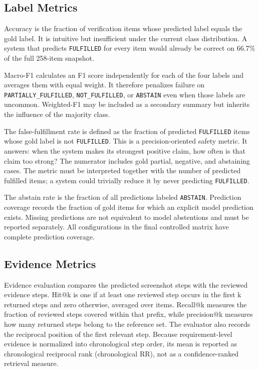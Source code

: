 \subsection{Label Metrics}\label{label-metrics}

Accuracy is the fraction of verification items whose predicted label equals the gold label. It is intuitive but insufficient under the current class distribution. A system that predicts \texttt{FULFILLED} for every item would already be correct on 66.7\% of the full 258-item snapshot.

Macro-F1 calculates an F1 score independently for each of the four labels and averages them with equal weight. It therefore penalizes failure on \texttt{PARTIALLY\_\allowbreak FULFILLED}, \texttt{NOT\_FULFILLED}, or \texttt{ABSTAIN} even when those labels are uncommon. Weighted-F1 may be included as a secondary summary but inherits the influence of the majority class.

The false-fulfillment rate is defined as the fraction of predicted \texttt{FULFILLED} items whose gold label is not \texttt{FULFILLED}. This is a precision-oriented safety metric. It answers: when the system makes its strongest positive claim, how often is that claim too strong? The numerator includes gold partial, negative, and abstaining cases. The metric must be interpreted together with the number of predicted fulfilled items; a system could trivially reduce it by never predicting \texttt{FULFILLED}.

The abstain rate is the fraction of all predictions labeled \texttt{ABSTAIN}. Prediction coverage records the fraction of gold items for which an explicit model prediction exists. Missing predictions are not equivalent to model abstentions and must be reported separately. All configurations in the final controlled matrix have complete prediction coverage.

\subsection{Evidence Metrics}\label{evidence-metrics}

Evidence evaluation compares the predicted screenshot steps with the reviewed
evidence steps. Hit@k is one if at least one reviewed step occurs in the first
k returned steps and zero otherwise, averaged over items. Recall@k measures the
fraction of reviewed steps covered within that prefix, while precision@k
measures how many returned steps belong to the reference set. The evaluator
also records the reciprocal position of the first relevant step. Because
requirement-level evidence is normalized into chronological step order, its
mean is reported as chronological reciprocal rank (chronological RR), not as a
confidence-ranked retrieval measure.

